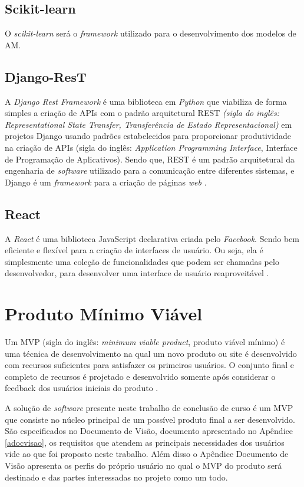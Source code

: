 \subsection{Scikit-learn}
O \textit{scikit-learn} será o \textit{framework} utilizado para o desenvolvimento dos modelos de AM.
\subsection{Django-ResT}

A \textit{Django Rest Framework} é uma biblioteca em \textit{Python} que viabiliza de forma simples a criação de APIs com o padrão arquitetural REST \textit{(sigla do inglês: Representational State Transfer, Transferência de Estado Representacional)} em projetos Django usando padrões estabelecidos para proporcionar produtividade na criação de APIs (sigla do inglês: \textit{Application Programming Interface}, Interface de Programação de Aplicativos). Sendo que, REST é um padrão arquitetural da engenharia de \textit{software} utilizado para a comunicação entre diferentes sistemas, e Django é um \textit{framework} para a criação de páginas \textit{web} \cite{christie2011django}.

\subsection{React}

A \textit{React} é uma biblioteca JavaScript declarativa criada pelo \textit{Facebook}. Sendo bem eficiente e flexível para a criação de interfaces de usuário. Ou seja, ela é simplesmente uma coleção de funcionalidades que podem ser chamadas pelo desenvolvedor, para desenvolver uma interface de usuário reaproveitável \cite{reactjs}.

\section{Produto Mínimo Viável}

Um MVP (sigla do inglês: \textit{minimum viable product}, produto viável mínimo) é uma técnica de desenvolvimento na qual um novo produto ou site é desenvolvido com recursos suficientes para satisfazer os primeiros usuários. O conjunto final e completo de recursos é projetado e desenvolvido somente após considerar o feedback dos usuários iniciais do produto \cite{MVP}.

A solução de \textit{software} presente neste trabalho de conclusão de curso é um MVP que consiste no núcleo principal de um possível produto final a ser desenvolvido. São especificados no Documento de Visão, documento apresentado no Apêndice \ref{adocvisao}, os requisitos que atendem as principais necessidades dos usuários vide ao que foi proposto neste trabalho. Além disso o Apêndice Documento de Visão apresenta os perfis do próprio usuário no qual o MVP do produto será destinado e das partes interessadas no projeto como um todo.
